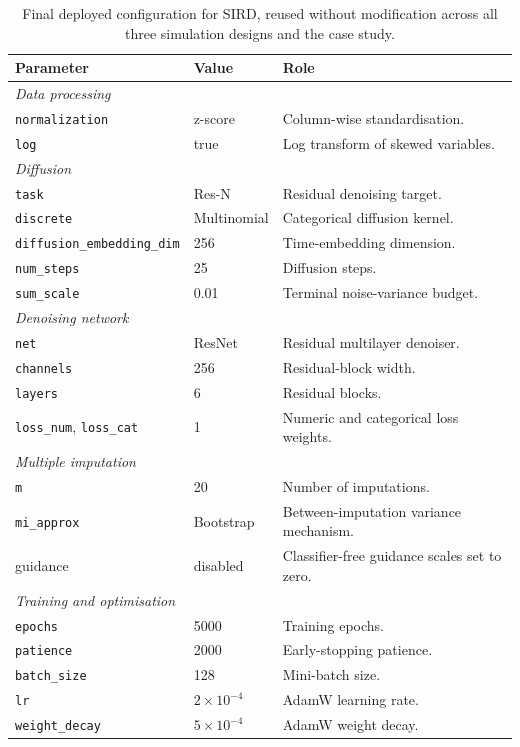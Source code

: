 \begin{table}[ht]
\centering
\caption{Final deployed configuration for SIRD, reused without modification across all three simulation designs and the case study.}
\label{tab:config_sird}
\begin{tabularx}{\textwidth}{ll>{\raggedright\arraybackslash}X}
\toprule
Parameter & Value & Role \\
\midrule
\multicolumn{3}{l}{\textit{Data processing}} \\
\texttt{normalization} & z-score & Column-wise standardisation. \\
\texttt{log} & true & Log transform of skewed variables. \\
\midrule
\multicolumn{3}{l}{\textit{Diffusion}} \\
\texttt{task} & Res-N & Residual denoising target. \\
\texttt{discrete} & Multinomial & Categorical diffusion kernel. \\
\texttt{diffusion\_embedding\_dim} & 256 & Time-embedding dimension. \\
\texttt{num\_steps} & 25 & Diffusion steps. \\
\texttt{sum\_scale} & 0.01 & Terminal noise-variance budget. \\
\midrule
\multicolumn{3}{l}{\textit{Denoising network}} \\
\texttt{net} & ResNet & Residual multilayer denoiser. \\
\texttt{channels} & 256 & Residual-block width. \\
\texttt{layers} & 6 & Residual blocks. \\
\texttt{loss\_num}, \texttt{loss\_cat} & 1 & Numeric and categorical loss weights. \\
\midrule
\multicolumn{3}{l}{\textit{Multiple imputation}} \\
\texttt{m} & 20 & Number of imputations. \\
\texttt{mi\_approx} & Bootstrap & Between-imputation variance mechanism. \\
guidance & disabled & Classifier-free guidance scales set to zero. \\
\midrule
\multicolumn{3}{l}{\textit{Training and optimisation}} \\
\texttt{epochs} & 5000 & Training epochs. \\
\texttt{patience} & 2000 & Early-stopping patience. \\
\texttt{batch\_size} & 128 & Mini-batch size. \\
\texttt{lr} & $2 \times 10^{-4}$ & AdamW learning rate. \\
\texttt{weight\_decay} & $5 \times 10^{-4}$ & AdamW weight decay. \\
\bottomrule
\end{tabularx}
\end{table}

